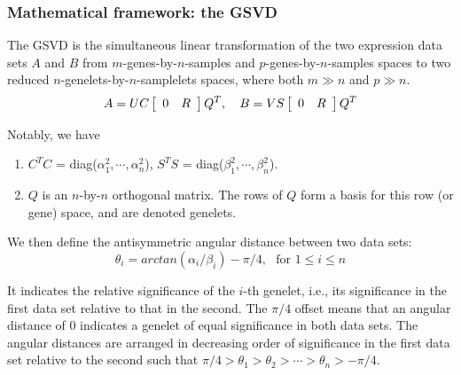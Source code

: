\subsubsection{Mathematical framework: the GSVD}
The GSVD is the simultaneous linear transformation of the two expression data sets $A$ and $B$ from $m$-genes-by-$n$-samples and $p$-genes-by-$n$-samples spaces to two reduced $n$-genelets-by-$n$-samplelets spaces, where both $m \gg n$ and $p \gg n$. 
\begin{equation}
	A = UC\left[ \begin{array}{cc} 0 & R \end{array} \right]Q^T, \quad B = VS\left[ \begin{array}{cc} 0 & R \end{array} \right]Q^T
\end{equation}

Notably, we have
\begin{enumerate}
\item $C^T C $ = diag($\alpha_1^{2}, \cdots, \alpha_n^{2}$), 
$S^T S$ = diag($\beta_1^{2}, \cdots, \beta_n^{2}$).
\item $Q$ is an $n$-by-$n$ orthogonal matrix. The rows of $Q$ form a basis for this row (or gene) space, and are denoted genelets.
\end{enumerate}


We then define the antisymmetric angular distance between two data sets:
\begin{equation}\label{eq-angular}
	\theta_{i} = arctan(\alpha_{i}/\beta_{i}) - \pi/4, \ \ \ \text{for } 1 \leq i \leq n 
\end{equation}

It indicates the relative significance of the $i$-th genelet, i.e., its significance in the first data set relative to that in the second. The $\pi/4$ offset means that an angular distance of 0 indicates a genelet of equal significance in both data sets. The angular distances are arranged in decreasing order of significance in the first data set relative to the second such that $\pi/4 > \theta_{1} > \theta_{2} > \cdots > \theta_{n} > -\pi/4$.


